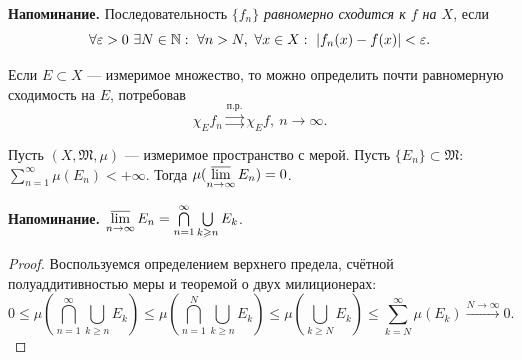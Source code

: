 \noindent \textbf{Напоминание.} Последовательность $\{f_n\}$ \textit{равномерно сходится к $f$ на $X$}, если 
\[\forall \varepsilon > 0 \ \exists N \in \mathbb{N}: \ \forall n > N, \ \forall x \in X: \ |f_n(x)-f(x)| < \varepsilon.\]

\begin{remark}
    Если $E \subset X$ — измеримое множество, то можно определить почти равномерную сходимость на $E$, потребовав
    \[\chi_E f_n \overset{\text{п.р.}}{\rightrightarrows} \chi_E f, \ n \to \infty.\]
\end{remark}

\begin{theorem}
    Пусть $(X, \mathfrak{M}, \mu)$ — измеримое пространство с мерой.
    Пусть $\{E_n\} \subset \mathfrak{M}$: $\sum\limits_{n=1}^{\infty}\mu(E_n) < + \infty$.
    Тогда $\mu(\operatorname*{\overline{lim}}\limits_{n\to \infty}E_n) = 0$.
\end{theorem} 
\noindent \textbf{Напоминание.} $\operatorname*{\overline{lim}}\limits_{n \to \infty} E_n = \bigcap\limits_{n=1}^{\infty} \bigcup\limits_{k\geqslant n}E_k$.
\begin{proof}
    Воспользуемся определением верхнего предела, счётной полуаддитивностью меры и теоремой о двух милиционерах:
    \[0 \leqslant \mu\left(\bigcap\limits_{n=1}^{\infty} \bigcup\limits_{k \geqslant n}E_k\right) 
    \leqslant 
    \mu\left(\bigcap\limits_{n=1}^{N} \bigcup\limits_{k \geqslant n}E_k\right)
    \leqslant
    \mu\left(\bigcup\limits_{k \geqslant N}E_k\right)
    \leqslant
    \sum\limits_{k=N}^{\infty} \mu(E_k) \xrightarrow{N \to \infty}0.\]
\end{proof} 

